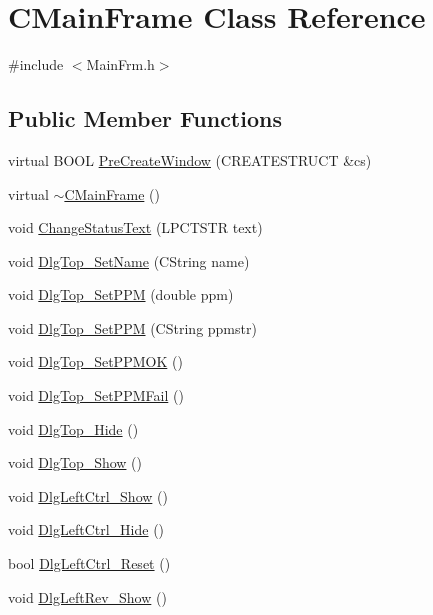 \hypertarget{classCMainFrame}{
\section{CMainFrame Class Reference}
\label{classCMainFrame}
}


{\ttfamily \#include $<$MainFrm.h$>$}

\subsection*{Public Member Functions}
\begin{DoxyCompactItemize}
\item 
virtual BOOL \hyperlink{classCMainFrame_a549bf677c955c2898c3c683321633c16}{PreCreateWindow} (CREATESTRUCT \&cs)
\item 
virtual \hyperlink{classCMainFrame_a8ae555f23fdf97edb4feb4d3e1bfa4ee}{$\sim$CMainFrame} ()
\item 
void \hyperlink{classCMainFrame_ae6d5a88cda792005ac27d280695a74bf}{ChangeStatusText} (LPCTSTR text)
\item 
void \hyperlink{classCMainFrame_a7fdb21df5ff31e62a4474795b4c030ed}{DlgTop\_\-SetName} (CString name)
\item 
void \hyperlink{classCMainFrame_aed5e82fe9e43effc4a1eb9e4d66ec9c7}{DlgTop\_\-SetPPM} (double ppm)
\item 
void \hyperlink{classCMainFrame_aa7286fd6eca543c50752268a21534c91}{DlgTop\_\-SetPPM} (CString ppmstr)
\item 
void \hyperlink{classCMainFrame_a6fec7d3a62cd056f6c2cff8b19cd2112}{DlgTop\_\-SetPPMOK} ()
\item 
void \hyperlink{classCMainFrame_a22d8af71732f7d458a0ccfbfb9b0cc20}{DlgTop\_\-SetPPMFail} ()
\item 
void \hyperlink{classCMainFrame_ad9c1c7e7f2b4d1322f8a95805d6181d3}{DlgTop\_\-Hide} ()
\item 
void \hyperlink{classCMainFrame_a01beeffe01a72d56194dced023eb7cd6}{DlgTop\_\-Show} ()
\item 
void \hyperlink{classCMainFrame_aa98160b422fdedcbfb6a4a2963948855}{DlgLeftCtrl\_\-Show} ()
\item 
void \hyperlink{classCMainFrame_ac64887ea64223b7b45b7fb9c41440cf5}{DlgLeftCtrl\_\-Hide} ()
\item 
bool \hyperlink{classCMainFrame_a10c31f69c847e755bbe498b6567182af}{DlgLeftCtrl\_\-Reset} ()
\item 
void \hyperlink{classCMainFrame_a80bae36b692b1c988d79fb338164d0cb}{DlgLeftRev\_\-Show} ()

\end{DoxyCompactItemize}
